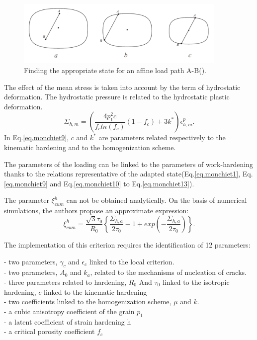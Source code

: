 \begin{figure}[h!]
	\centering
	\includegraphics[width=0.9\textwidth]{figures//adaptation.png} 
	\caption{Finding the appropriate state for an affine load path A-B(\cite{koutiri2011effet}).}
	\label{fig.adaptation}
\end{figure}

The effect of the mean stress is taken into account by the term of hydrostatic deformation. The hydrostatic pressure is related to the hydrostatic plastic deformation. 
\begin{equation}
\Sigma_{h,m}=\left( \dfrac{4p_1^2c}{f_cln(f_c)}\left( 1-f_c\right)+3k^{\ast} \right) \epsilon_{h,m}^p.
\label{eq.monchiet9}
\end{equation}
In Eq.\eqref{eq.monchiet9}, $c$ and $k^{\ast}$ are parameters related respectively to the kinematic hardening and to the homogenization scheme.

The parameters of the loading can be linked to the parameters of work-hardening thanks to the relations representative of the adapted state(Eq.\ref{eq.monchiet1}, Eq.\ref{eq.monchiet9} and Eq.\ref{eq.monchiet10} to Eq.\ref{eq.monchiet13}).

The parameter $\xi_{cum}^h$ can not be obtained analytically. On the basis of numerical simulations, the authors propose an approximate expression:
\begin{equation}
\xi_{cum}^h=\dfrac{\sqrt{3}\tau_0}{R_0}\left\lbrace \dfrac{\Sigma_{h,a}}{2\tau_0}-1+exp\left(-\dfrac{\Sigma_{h,a}}{2\tau_0} \right) \right\rbrace .
\label{eq.monchiet17}
\end{equation}





The implementation of this criterion requires the identification of 12 parameters:
\begin{flushleft}
	\qquad - \qquad two parameters, $\gamma_c$ and $\epsilon_c$ linked to the local criterion.\\
	\qquad - \qquad two parameters, $A_0$ and $k_a$, related to the mechanisms of nucleation of cracks.\\
	\qquad - \qquad three parameters related to hardening, $R_0$ And $\tau_0$ linked to the isotropic hardening, $c$ linked to  the kinematic hardening\\
	\qquad - \qquad two coefficients linked to the homogenization scheme, $\mu$ and $k$.\\
	\qquad - \qquad a cubic anisotropy coefficient of the grain $p_1$\\
	\qquad - \qquad a latent coefficient of strain hardening h\\
	\qquad - \qquad a critical porosity coefficient $f_c$\\
\end{flushleft}

